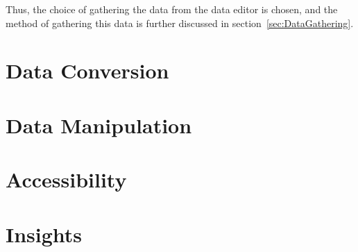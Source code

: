 \documentclass[12pt,onecolumn]{IEEEtran}
\begin{document}
Thus, the choice of gathering the data from the data editor is chosen, and the method of gathering this data is further discussed in section~\ref{sec:DataGathering}.


\section{Data Conversion} \label{sec:DataConversion}

\section{Data Manipulation} \label{sec:DataManipulation}

\section{Accessibility} \label{sec:Accessibility}

\section{Insights} \label{sec:Insights}


\cite{datasite}



\end{document}
